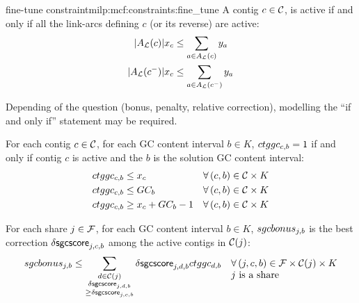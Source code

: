 \begin{definition}{\MGC{} fine-tune constraint}{milp:mcf:constraints:fine_tune}
  A contig \(c \in \mathcal{C}{}\), is active if and only if all the link-arcs defining \(c\) (or its reverse) are active:
  \begin{align}
    |A_{\mathcal{L}}{}(c)|x_c & \leq \sum_{a \in A_{\mathcal{L}}{}(c)} y_a \\
    |A_{\mathcal{L}}{}(c^-)|x_c & \leq \sum_{a \in A_{\mathcal{L}}{}(c^-)} y_a
  \end{align}

  \begin{questionbox}
    Depending of the question (bonus, penalty, relative correction), modelling the \enquote{if and only if} statement may be required.
  \end{questionbox}

  For each contig \(c \in \mathcal{C}{}\), for each GC content interval \(b \in K\), \(ctggc_{c,b} = 1\) if and only if contig \(c\) is active and the \(b\) is the solution GC content interval:
  \begin{align}
    \ctggc{c}{b} & \leq x_c & \forall (c, b) \in \Contigs{} \times K \\
    \ctggc{c}{b} & \leq GC_b & \forall (c, b) \in \Contigs{} \times K \\
    \ctggc{c}{b} & \geq x_c + GC_b - 1 & \forall (c, b) \in \Contigs{} \times K
  \end{align}

  For each share \(j \in \mathcal{F}{}\), for each GC content interval \(b \in K\), \(sgcbonus_{j, b}\) is the best correction \(\mathsf{\delta sgcscore}_{j, c, b}\) among the active contigs in \(\mathcal{C}(j)\):
  \begin{equation}
    \sgcbonus{j}{b} \leq \sum_{\substack{
        d \in \Contigs(j) \\ \dsgcscore{j}{d}{b} \\ \geq \dsgcscore{j}{c}{b}
    }} \dsgcscore{j}{d}{b} \ctggc{d}{b} \quad
    \begin{array}[t]{@{}l@{}}
      \forall (j, c, b) \in \Fragments{} \times \Contigs{}(j) \times K \\
      j \text{ is a share}
    \end{array}
  \end{equation}

\end{definition}

